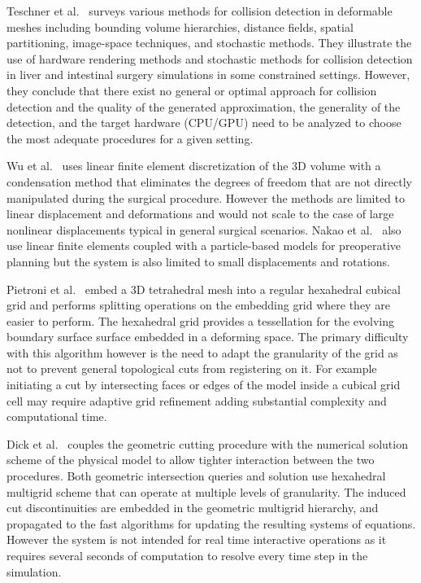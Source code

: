 Teschner et al.~\cite{teschner:cgf:2005} surveys various methods for collision detection in deformable meshes including 
bounding volume hierarchies, distance fields, spatial partitioning, image-space techniques, and 
stochastic methods. They illustrate the use of hardware rendering methods and stochastic methods for collision detection in liver and intestinal surgery simulations in some constrained settings. However, they conclude that there exist no general or optimal approach for collision detection and the quality of the generated approximation, the generality of the detection, and the target hardware (CPU/GPU) need to be analyzed to choose the most adequate procedures for a given setting. 

Wu et al.~\cite{wu:tvc:2005} uses linear finite element discretization of the 3D volume with a condensation method that eliminates the degrees of freedom that are not directly manipulated during the surgical procedure. However the methods are limited to linear displacement and deformations and would not scale to the case of large nonlinear displacements typical in general surgical scenarios. Nakao et al.~\cite{nakao:jms:2006} also use linear finite elements coupled with a particle-based models for preoperative planning but the system is also limited to small displacements and rotations.  

Pietroni et al.~\cite{pietroni:tvc:2009} embed a 3D tetrahedral mesh into a regular hexahedral cubical grid and performs splitting operations on the embedding grid where they are easier to perform. The hexahedral grid provides a tessellation for the evolving boundary surface surface embedded in a deforming space. The primary difficulty with this algorithm however is the need to adapt the granularity of the grid as not to prevent general topological cuts from registering on it. For example initiating a cut by intersecting faces or edges of the model inside a cubical grid cell may require adaptive grid refinement adding substantial complexity and computational time. 

Dick et al.~\cite{dick:tvcg:2011} couples the geometric cutting procedure with the numerical solution scheme of the physical model to allow tighter interaction between the two procedures. Both geometric intersection queries and solution use hexahedral multigrid scheme that can operate at multiple levels of granularity. The induced cut discontinuities are embedded in the geometric multigrid hierarchy, and propagated to the fast algorithms for updating the resulting systems of equations. However the system is not intended for real time interactive operations as it requires several seconds of computation to resolve every time step in the simulation. 

